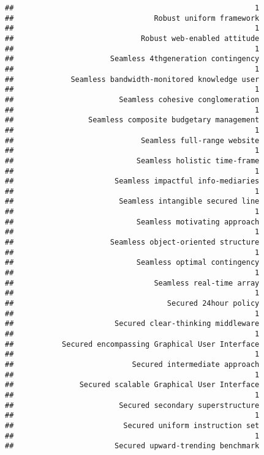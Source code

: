 \documentclass[
]{article}
\begin{document}
\begin{verbatim}
##                                                       1 
##                                Robust uniform framework 
##                                                       1 
##                             Robust web-enabled attitude 
##                                                       1 
##                      Seamless 4thgeneration contingency 
##                                                       1 
##             Seamless bandwidth-monitored knowledge user 
##                                                       1 
##                        Seamless cohesive conglomeration 
##                                                       1 
##                 Seamless composite budgetary management 
##                                                       1 
##                             Seamless full-range website 
##                                                       1 
##                            Seamless holistic time-frame 
##                                                       1 
##                       Seamless impactful info-mediaries 
##                                                       1 
##                        Seamless intangible secured line 
##                                                       1 
##                            Seamless motivating approach 
##                                                       1 
##                      Seamless object-oriented structure 
##                                                       1 
##                            Seamless optimal contingency 
##                                                       1 
##                                Seamless real-time array 
##                                                       1 
##                                   Secured 24hour policy 
##                                                       1 
##                       Secured clear-thinking middleware 
##                                                       1 
##           Secured encompassing Graphical User Interface 
##                                                       1 
##                           Secured intermediate approach 
##                                                       1 
##               Secured scalable Graphical User Interface 
##                                                       1 
##                        Secured secondary superstructure 
##                                                       1 
##                         Secured uniform instruction set 
##                                                       1 
##                       Secured upward-trending benchmark 

\end{verbatim}
\end{document}
